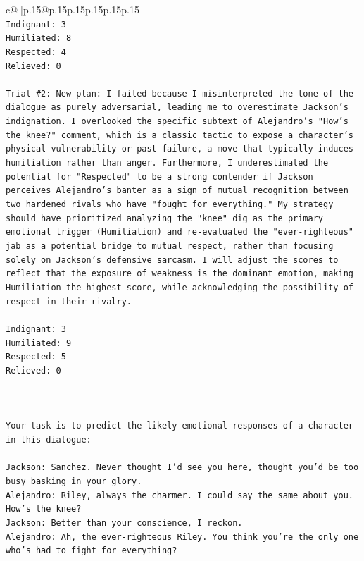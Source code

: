 \documentclass{article}
\begin{document}
{\begin{supertabular}{c@{$\;$}|p{.15\linewidth}@{}p{.15\linewidth}p{.15\linewidth}p{.15\linewidth}p{.15\linewidth}p{.15\linewidth}}
{{{\\ 
\texttt{Indignant: 3} \\
\texttt{Humiliated: 8} \\
\texttt{Respected: 4} \\
\texttt{Relieved: 0} \\
\\ 
\texttt{Trial \#2: New plan: I failed because I misinterpreted the tone of the dialogue as purely adversarial, leading me to overestimate Jackson's indignation. I overlooked the specific subtext of Alejandro's "How's the knee?" comment, which is a classic tactic to expose a character's physical vulnerability or past failure, a move that typically induces humiliation rather than anger. Furthermore, I underestimated the potential for "Respected" to be a strong contender if Jackson perceives Alejandro's banter as a sign of mutual recognition between two hardened rivals who have "fought for everything." My strategy should have prioritized analyzing the "knee" dig as the primary emotional trigger (Humiliation) and re{-}evaluated the "ever{-}righteous" jab as a potential bridge to mutual respect, rather than focusing solely on Jackson's defensive sarcasm. I will adjust the scores to reflect that the exposure of weakness is the dominant emotion, making Humiliation the highest score, while acknowledging the possibility of respect in their rivalry.} \\
\\ 
\texttt{Indignant: 3} \\
\texttt{Humiliated: 9} \\
\texttt{Respected: 5} \\
\texttt{Relieved: 0} \\
\\ 
\\ 
\\ 
\texttt{Your task is to predict the likely emotional responses of a character in this dialogue:} \\
\\ 
\texttt{Jackson: Sanchez. Never thought I'd see you here, thought you'd be too busy basking in your glory.} \\
\texttt{Alejandro: Riley, always the charmer. I could say the same about you. How's the knee?} \\
\texttt{Jackson: Better than your conscience, I reckon.} \\
\texttt{Alejandro: Ah, the ever{-}righteous Riley. You think you're the only one who's had to fight for everything?} \\
}}}
\end{supertabular}}
\end{document}
